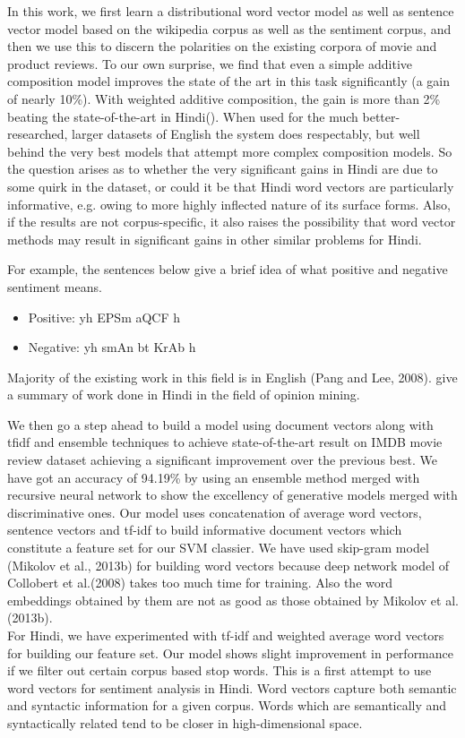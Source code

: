 In this work, we first learn a distributional word vector model as well as sentence vector model based on the wikipedia corpus as well as the sentiment corpus, and then we use this to discern the polarities on the existing corpora of movie and product reviews. To our own surprise, we find that even a simple additive composition model improves the state of the art in this task significantly (a gain of nearly 10\%). With weighted additive composition, the gain is more than 2\% beating the state-of-the-art in Hindi(\cite{Singh:15}). When used for the much better-researched, larger datasets of English the system does respectably, but well behind the very best models that attempt more complex composition models. So the question arises as to whether the very significant gains in Hindi are due to some quirk in the dataset, or could it be that Hindi word vectors are particularly informative,
e.g. owing to more highly inflected nature of its surface forms.  Also, if the results are not corpus-specific, it also raises the possibility that word vector methods may result in significant gains in
other similar problems for Hindi. 

For example, the sentences below give a brief idea of what positive and negative sentiment means.
\begin{itemize}
\item Positive: {\dn yh EPSm aQCF h\4}
\item Negative: {\dn yh smAn bt KrAb h\4}
\end{itemize}
Majority of the existing work in this field is in English (Pang and Lee, 2008). \cite{Sharma:14} give a summary of work done in Hindi in the field of opinion mining.

We then go a step ahead to build a model using document vectors along with tfidf and ensemble techniques to achieve state-of-the-art result on IMDB movie review dataset achieving a significant improvement over the previous best. We have got an accuracy of 94.19\% by using an ensemble method merged with recursive neural network to show the excellency of generative models merged with discriminative ones.
Our model uses concatenation of average word vectors, sentence vectors and tf-idf to build informative document vectors which constitute a feature set for our SVM classier. We have used skip-gram model (Mikolov et al., 2013b) for building word vectors because deep network model of Collobert et al.(2008) takes too much time for training. Also the word embeddings obtained by them are not as good as those obtained by Mikolov et al.(2013b). \\
For Hindi, we have experimented with tf-idf and weighted average word vectors for building our feature set. Our model shows slight improvement in performance if we filter out certain corpus based stop words. This is a first attempt to use word vectors for sentiment analysis in Hindi. Word vectors capture both semantic and syntactic information for a given corpus. Words which are semantically and syntactically related tend to be closer in high-dimensional space.\\

